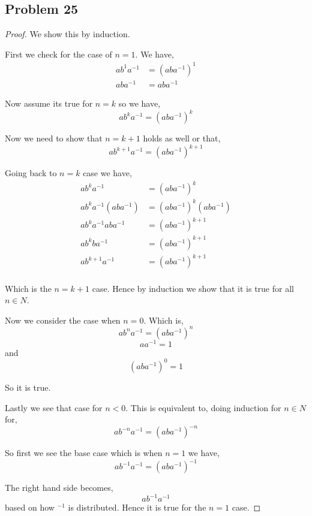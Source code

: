 \documentclass[a4paper]{report}
\begin{document}
\subsection*{Problem 25}
    \begin{proof}
        We show this by induction. 

        First we check for the case of $n = 1$. We have, 
        \begin{align*}
            ab^{1}a^{-1} &= (aba^{-1})^{1}\\
            aba^{-1} &= aba^{-1}
        \end{align*}

        Now assume its true for $n = k$ so we have, 
        $$ ab^{k}a^{-1}= (aba^{-1})^{k} $$ 

        Now we need to show that $n = k + 1$ holds as well or that, 
        $$ ab^{k + 1} a^{ -1} = (a ba ^{-1}) ^{k + 1} $$ 


        Going back to $n = k$ case we have, 
        \begin{align*}
            ab^{k}a^{-1} &= (aba^{-1})^{k} \\
            ab^{k}a^{-1} (aba^{-1}) &= (aba^{-1})^{k} (aba^{-1})\\
            ab^{k}a^{-1}a b a^{-1} &= (aba^{-1})^{k + 1}\\
            ab^{k} b a^{-1} &= (aba^{-1})^{k + 1}\\
            ab^{k + 1}a^{-1} &= (aba^{-1})^{k + 1}\\
        \end{align*}

        Which is the $n = k + 1$ case. Hence by induction we show that it is true for all $n \in N$. 
        
        Now we consider the case when  $n = 0$. Which is, 
        $$ ab^{n}a^{-1} = (aba^{-1})^{n} $$ 
        $$ a a^{-1} = 1 $$  and  
        $$ (aba^{-1})^{0}  = 1 $$ 

        So it is true.

        Lastly we see that case for $n < 0$. This is equivalent to, doing induction for $n \in N$ for, 
        $$ ab^{-n}a^{-1} = (aba^{-1})^{-n} $$
                
        So first we see the base case which is  when $n = 1$ we have, 
        $$ ab^{-1}a^{-1} = (aba^{-1})^{-1} $$ 

        The right hand side becomes, 
        $$ ab^{-1}a^{-1} $$ based on how $^{-1}$ is distributed. 
        Hence it is true for the $n = 1$ case.




\end{proof}
\end{document}
